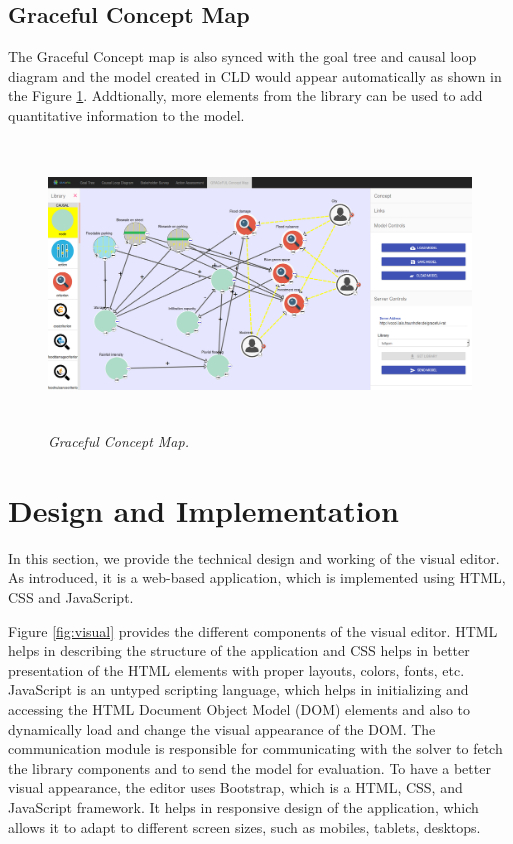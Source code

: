 \documentclass[a4paper]{article}
\begin{document}
\subsection{Graceful Concept Map}

The Graceful Concept map is also synced with the goal tree and causal loop diagram and the model created in CLD would appear automatically as shown in the Figure \ref{fig:gcm}. Addtionally, more elements from the library can be used to add quantitative information to the model.

\begin{figure}
\begin{center}
\includegraphics[height=3in,width=5in]{img/gcm.png}
\caption{\small \sl Graceful Concept Map.\label{fig:gcm}}
\end{center}
\end{figure}

\newpage

\section{Design and Implementation}
\label{implementation}

In this section, we provide the technical design and working of the visual editor. As introduced, it is a web-based application, which is implemented using HTML, CSS and JavaScript.  

Figure \ref{fig:visual} provides the different components of the visual editor. HTML helps in describing the structure of the application and CSS helps in better presentation of the HTML elements with proper layouts, colors, fonts, etc. JavaScript is an untyped scripting language, which helps in initializing and accessing the HTML Document Object Model (DOM) elements and also to dynamically load and change the visual appearance of the DOM. The communication module is responsible for communicating with the solver to fetch the library components and to send the model for evaluation. To have a better visual appearance, the editor uses Bootstrap, which is a HTML, CSS, and JavaScript framework. It helps in responsive design of the application, which allows it to adapt to different screen sizes, such as mobiles, tablets, desktops.
\end{document}
